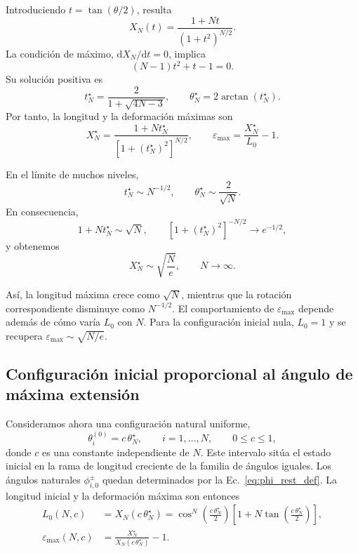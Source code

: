\documentclass[11pt,a4paper]{article}
\begin{document}
Introduciendo $t=\tan(\theta/2)$, resulta
\begin{equation}
X_N(t)=\frac{1+Nt}{(1+t^2)^{N/2}}.
\end{equation}
La condición de máximo,
$\mathrm{d}X_N/\mathrm{d}t=0$, implica
\begin{equation}
(N-1)t^2+t-1=0.
\end{equation}
Su solución positiva es
\begin{equation}
t_N^\star
=
\frac{2}{1+\sqrt{4N-3}},
\qquad
\theta_N^\star=2\arctan(t_N^\star).
\label{eq:theta_max_extension}
\end{equation}
Por tanto, la longitud y la deformación máximas son
\begin{equation}
X_N^\star
=
\frac{1+Nt_N^\star}
{\left[1+(t_N^\star)^2\right]^{N/2}},
\qquad
\varepsilon_{\max}=\frac{X_N^\star}{L_0}-1.
\label{eq:max_extension_finite_N}
\end{equation}

En el límite de muchos niveles,
\begin{equation}
t_N^\star\sim N^{-1/2},
\qquad
\theta_N^\star\sim\frac{2}{\sqrt{N}}.
\end{equation}
En consecuencia,
\begin{equation}
1+Nt_N^\star\sim\sqrt{N},
\qquad
\left[1+(t_N^\star)^2\right]^{-N/2}
\longrightarrow e^{-1/2},
\end{equation}
y obtenemos
\begin{equation}
\boxed{
X_N^\star\sim\sqrt{\frac{N}{e}},
\qquad N\to\infty.
}
\label{eq:max_extension_scaling}
\end{equation}

Así, la longitud máxima crece como $\sqrt{N}$, mientras que
la rotación correspondiente disminuye como $N^{-1/2}$. El
comportamiento de $\varepsilon_{\max}$ depende además de cómo
varía $L_0$ con $N$. Para la configuración inicial nula,
$L_0=1$ y se recupera $\varepsilon_{\max}\sim\sqrt{N/e}$.

\subsection{Configuración inicial proporcional al ángulo de máxima extensión}
\label{sec:initial_fraction}

Consideramos ahora una configuración natural uniforme,
\begin{equation}
\theta_i^{(0)}=c\,\theta_N^\star,
\qquad i=1,\ldots,N,\qquad 0\leq c\leq1,
\label{eq:theta_initial_fraction}
\end{equation}
donde $c$ es una constante independiente de $N$. Este intervalo
sitúa el estado inicial en la rama de longitud creciente de la
familia de ángulos iguales. Los ángulos naturales $\phi_{i,0}^{\pm}$
quedan determinados por la Ec.~\eqref{eq:phi_rest_def}.
La longitud inicial y la deformación máxima son entonces
\begin{align}
L_0(N,c)
&=X_N(c\,\theta_N^\star)
=\cos^N\!\left(\frac{c\,\theta_N^\star}{2}\right)
\left[1+N\tan\!\left(\frac{c\,\theta_N^\star}{2}\right)\right],
\label{eq:L0_fraction}
\\
\varepsilon_{\max}(N,c)
&=\frac{X_N^\star}{X_N(c\,\theta_N^\star)}-1.
\label{eq:strain_max_fraction}
\end{align}
\end{document}
